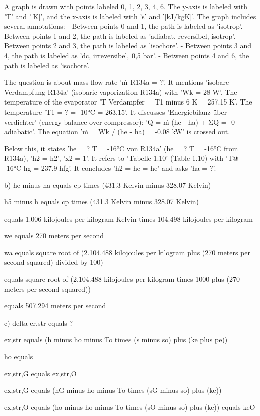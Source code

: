 A graph is drawn with points labeled 0, 1, 2, 3, 4, 6. The y-axis is labeled with 'T' and '[K]', and the x-axis is labeled with 's' and '[kJ/kgK]'. The graph includes several annotations: 
- Between points 0 and 1, the path is labeled as 'isotrop'.
- Between points 1 and 2, the path is labeled as 'adiabat, reversibel, isotrop'.
- Between points 2 and 3, the path is labeled as 'isochore'.
- Between points 3 and 4, the path is labeled as 'dc, irreversibel, 0,5 bar'.
- Between points 4 and 6, the path is labeled as 'isochore'.

The question is about mass flow rate 'ṁ R134a = ?'. It mentions 'isobare Verdampfung R134a' (isobaric vaporization R134a) with 'Wk = 28 W'. The temperature of the evaporator 'T Verdampfer = T1 minus 6 K = 257.15 K'. The temperature 'T1 = ? = -10°C = 263.15'. It discusses 'Energiebilanz über verdichter' (energy balance over compressor): 'Q = ṁ (he - ha) + ΣQ = -0 adiabatic'. The equation 'ṁ = Wk / (he - ha) = -0.08 kW' is crossed out.

Below this, it states 'he = ? T = -16°C von R134a' (he = ? T = -16°C from R134a), 'h2 = h2', 'x2 = 1'. It refers to 'Tabelle 1.10' (Table 1.10) with 'T@ -16°C hg = 237.9 hfg'. It concludes 'h2 = he = he' and asks 'ha = ?'.

b) he minus ha equals cp times (431.3 Kelvin minus 328.07 Kelvin)

h5 minus h equals cp times (431.3 Kelvin minus 328.07 Kelvin)

equals 1.006 kilojoules per kilogram Kelvin times 104.498 kilojoules per kilogram

we equals 270 meters per second

wa equals square root of (2.104.488 kilojoules per kilogram plus (270 meters per second squared) divided by 100)

equals square root of (2.104.488 kilojoules per kilogram times 1000 plus (270 meters per second squared))

equals 507.294 meters per second

c) delta er,str equals ?

ex,str equals (h minus ho minus To times (s minus so) plus (ke plus pe))

ho equals

ex,str,G equals ex,str,O

ex,str,G equals (hG minus ho minus To times (sG minus so) plus (ke))

ex,str,O equals (ho minus ho minus To times (sO minus so) plus (ke)) equals keO

